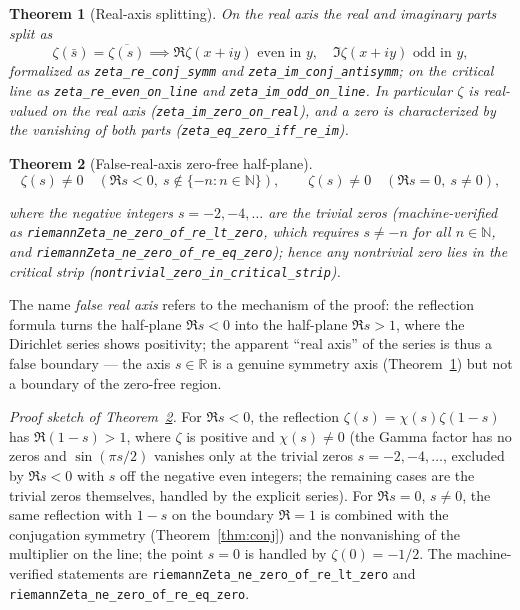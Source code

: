 \documentclass{article}
\newtheorem{theorem}{Theorem}[section]
\newcommand{\R}{\mathbb{R}}
\newcommand{\N}{\mathbb{N}}
\newcommand{\zt}{\zeta}
\newcommand{\Xchi}{\chi}
\begin{document}
\begin{theorem}[Real-axis splitting]
\label{thm:realaxis}
On the real axis the real and imaginary parts split as
\[
\zt(\bar s)=\overline{\zt(s)}
\implies
\Re\zt(x+iy)\text{ even in }y,\quad \Im\zt(x+iy)\text{ odd in }y,
\]
formalized as \texttt{zeta\_re\_conj\_symm} and
\texttt{zeta\_im\_conj\_antisymm}; on the critical line as
\texttt{zeta\_re\_even\_on\_line} and \texttt{zeta\_im\_odd\_on\_line}. In
particular $\zt$ is real-valued on the real axis
(\texttt{zeta\_im\_zero\_on\_real}), and a zero is characterized by the
vanishing of both parts (\texttt{zeta\_eq\_zero\_iff\_re\_im}).
\end{theorem}

\begin{theorem}[False-real-axis zero-free half-plane]
\label{thm:falseaxis}
\begin{equation}
\label{eq:false}
\zt(s)\neq 0\quad(\Re s<0,\ s\notin\{-n:n\in\N\}),\qquad
\zt(s)\neq 0\quad(\Re s=0,\ s\neq 0),
\end{equation}
\begin{sloppypar}where the negative integers $s=-2,-4,\dots$ are the trivial zeros
(machine-verified as \texttt{riemannZeta\_ne\_zero\_of\_re\_lt\_zero},
which requires $s\neq -n$ for all $n\in\N$, and
\texttt{riemannZeta\_ne\_zero\_of\_re\_eq\_zero}); hence any nontrivial zero
lies in the critical strip (\texttt{nontrivial\_zero\_in\_critical\_strip}).
\end{sloppypar}
\end{theorem}

The name \emph{false real axis} refers to the mechanism of the proof: the
reflection formula turns the half-plane $\Re s<0$ into the half-plane
$\Re s>1$, where the Dirichlet series shows positivity; the apparent ``real
axis'' of the series is thus a false boundary --- the axis $s\in\R$ is a
genuine symmetry axis (Theorem~\ref{thm:realaxis}) but not a boundary of the
zero-free region.

\emph{Proof sketch of Theorem~\ref{thm:falseaxis}.} For $\Re s<0$, the
reflection $\zt(s)=\Xchi(s)\zt(1-s)$ has $\Re(1-s)>1$, where $\zt$ is
positive and $\Xchi(s)\neq 0$ (the Gamma factor has no zeros and
$\sin(\pi s/2)$ vanishes only at the trivial zeros $s=-2,-4,\dots$, excluded
by $\Re s<0$ with $s$ off the negative even integers; the remaining cases
are the trivial zeros themselves, handled by the explicit series). For
$\Re s=0$, $s\neq 0$, the same reflection with $1-s$ on the boundary
$\Re=1$ is combined with the conjugation symmetry
(Theorem~\ref{thm:conj}) and the nonvanishing of the multiplier on the
line; the point $s=0$ is handled by $\zt(0)=-1/2$. The machine-verified
statements are \texttt{riemannZeta\_ne\_zero\_of\_re\_lt\_zero} and
\texttt{riemannZeta\_ne\_zero\_of\_re\_eq\_zero}.
\end{document}
